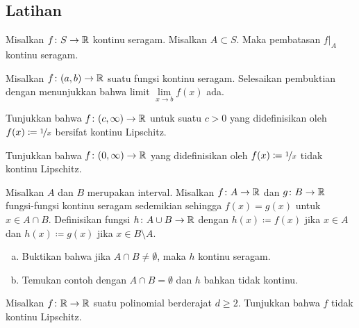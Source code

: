 \subsection{Latihan}

\begin{exercise}
Misalkan $f \colon S \to {\mathbb{R}}$ kontinu seragam.  Misalkan $A \subset S$.
Maka pembatasan $f|_A$ kontinu seragam.
\end{exercise}

\begin{exercise}
Misalkan $f \colon (a,b) \to {\mathbb{R}}$ suatu fungsi kontinu seragam.
Selesaikan pembuktian  dengan menunjukkan bahwa
limit
$\lim\limits_{x \to b} f(x)$
ada.
\end{exercise}

\begin{exercise}
Tunjukkan bahwa $f \colon (c,\infty) \to {\mathbb{R}}$ untuk suatu $c > 0$
yang didefinisikan oleh $f(x) \coloneqq \nicefrac{1}{x}$ bersifat kontinu Lipschitz.
\end{exercise}

\begin{exercise}
Tunjukkan bahwa $f \colon (0,\infty) \to {\mathbb{R}}$
yang didefinisikan oleh $f(x) \coloneqq \nicefrac{1}{x}$ tidak kontinu Lipschitz.
\end{exercise}

\begin{samepage}
\begin{exercise}
Misalkan $A$ dan $B$ merupakan interval.
Misalkan $f \colon A \to {\mathbb{R}}$ dan $g \colon B \to {\mathbb{R}}$ fungsi-fungsi kontinu seragam
sedemikian sehingga $f(x) = g(x)$ untuk $x \in A \cap B$.  Definisikan
fungsi $h \colon A \cup B \to {\mathbb{R}}$ dengan $h(x) \coloneqq f(x)$ jika
$x \in A$ dan $h(x) \coloneqq g(x)$ jika $x \in B \setminus A$.
\begin{enumerate}[a)]
\item
Buktikan bahwa jika $A \cap B \neq \emptyset$, maka $h$ kontinu seragam.
\item
Temukan contoh dengan $A \cap B = \emptyset$ dan $h$ bahkan tidak
kontinu.
\end{enumerate}
\end{exercise}
\end{samepage}

\begin{exercise}[Menantang]
Misalkan $f \colon {\mathbb{R}} \to {\mathbb{R}}$ suatu polinomial berderajat
$d \geq 2$.  Tunjukkan bahwa $f$ tidak kontinu
Lipschitz.
\end{exercise}

